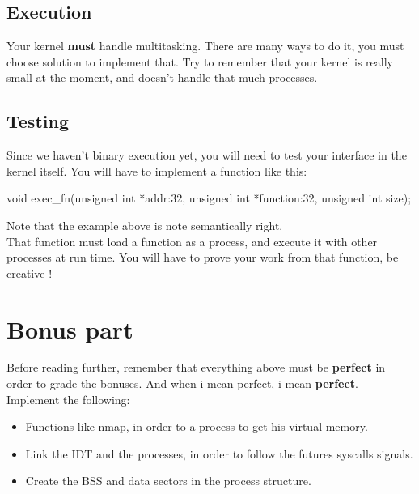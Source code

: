 \documentclass{42-en}
\begin{document}
	\section{Execution}
	Your kernel \textbf{must} handle multitasking. There are many ways to do it,
	you must choose solution to implement that. Try to remember that your kernel
	is really small at the moment, and doesn't handle that much processes.
	\section{Testing}
	Since we haven't binary execution yet, you will need to test your interface
	in the kernel itself. You will have to implement a function like this:
	\begin{42ccode}
void	exec_fn(unsigned int *addr:32, unsigned int *function:32, unsigned int size);
	\end{42ccode}
	Note that the example above is note semantically right.\\
	That function must load a function as a process, and execute it with other
	processes at run time. You will have to prove your work from that function,
	be creative !


\newpage
\chapter{Bonus part}
	Before reading further, remember that everything above must be \textbf{perfect}
	in order to grade the bonuses. And when i mean perfect, i mean \textbf{perfect}.\\
	Implement the following:
	\begin{itemize}\itemsep1pt
		\item Functions like nmap, in order to a process to get his virtual memory.
		\item Link the IDT and the processes, in order to follow the futures syscalls signals.
		\item Create the BSS and data sectors in the process structure.
	\end{itemize}


\newpage
\end{document}
